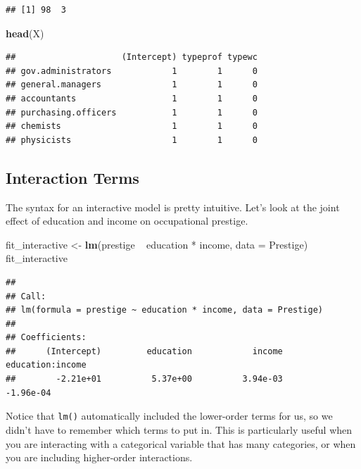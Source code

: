 \documentclass[12pt,oneside,openany]{book}
\newenvironment{Shaded}{\begin{snugshade}}{\end{snugshade}}
\newcommand{\KeywordTok}[1]{\textcolor[rgb]{0.13,0.29,0.53}{\textbf{{#1}}}}
\newcommand{\DataTypeTok}[1]{\textcolor[rgb]{0.13,0.29,0.53}{{#1}}}
\newcommand{\StringTok}[1]{\textcolor[rgb]{0.31,0.60,0.02}{{#1}}}
\newcommand{\NormalTok}[1]{{#1}}
\begin{document}
\begin{verbatim}
## [1] 98  3
\end{verbatim}

\begin{Shaded}
\begin{Highlighting}[]
\KeywordTok{head}\NormalTok{(X)}
\end{Highlighting}
\end{Shaded}

\begin{verbatim}
##                     (Intercept) typeprof typewc
## gov.administrators            1        1      0
## general.managers              1        1      0
## accountants                   1        1      0
## purchasing.officers           1        1      0
## chemists                      1        1      0
## physicists                    1        1      0
\end{verbatim}

\subsection{Interaction Terms}\label{interaction-terms-1}

The syntax for an interactive model is pretty intuitive. Let's look at
the joint effect of education and income on occupational prestige.

\begin{Shaded}
\begin{Highlighting}[]
\NormalTok{fit_interactive <-}\StringTok{ }\KeywordTok{lm}\NormalTok{(prestige ~}\StringTok{ }\NormalTok{education *}\StringTok{ }\NormalTok{income, }\DataTypeTok{data =} \NormalTok{Prestige)}
\NormalTok{fit_interactive}
\end{Highlighting}
\end{Shaded}

\begin{verbatim}
## 
## Call:
## lm(formula = prestige ~ education * income, data = Prestige)
## 
## Coefficients:
##      (Intercept)         education            income  education:income  
##        -2.21e+01          5.37e+00          3.94e-03         -1.96e-04
\end{verbatim}

Notice that \texttt{lm()} automatically included the lower-order terms
for us, so we didn't have to remember which terms to put in. This is
particularly useful when you are interacting with a categorical variable
that has many categories, or when you are including higher-order
interactions.
\end{document}
